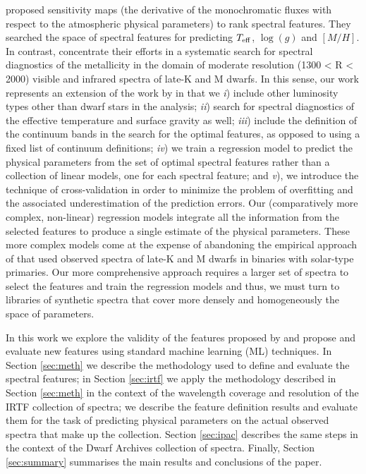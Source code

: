 \cite{cesetti} proposed sensitivity maps (the derivative of the
monochromatic fluxes with respect to the atmospheric physical
parameters) to rank spectral features. They searched the space of
spectral features for predicting $T_{\rm eff}$, $\log(g)$ and
$[M/H]$. In contrast, \cite{2013AJ....145...52M} concentrate their
efforts in a systematic search for spectral diagnostics of the
metallicity in the domain of moderate resolution (1300 < R < 2000)
visible and infrared spectra of late-K and M dwarfs. In this
sense, our work represents an extension of the work
by \cite{2013AJ....145...52M} in that we {\it i}) include other
luminosity types other than dwarf stars in the analysis; {\it ii})
search for spectral diagnostics of the effective temperature and
surface gravity as well; {\it iii}) include the definition of the
continuum bands in the search for the optimal features, as opposed to
using a fixed list of continuum definitions; {\it iv}) we train a
regression model to predict the physical parameters from the set of
optimal spectral features rather than a collection of linear models,
one for each spectral feature; and {\it v}), we introduce the
technique of cross-validation in order to minimize the problem of
overfitting \citep[see e.g.][]{gelman2013bayesian} and the associated
underestimation of the prediction errors. Our (comparatively more
complex, non-linear) regression models integrate all the information
from the selected features to produce a single estimate of the
physical parameters. These more complex models come at the expense of
abandoning the empirical approach of \cite{2013AJ....145...52M} that
used observed spectra of late-K and M dwarfs in binaries with
solar-type primaries. Our more comprehensive approach requires a
larger set of spectra to select the features and train the regression
models and thus, we must turn to libraries of synthetic spectra that
cover more densely and homogeneously the space of parameters.

In this work we explore the validity of the features proposed
by \cite{cesetti} and propose and evaluate new features using standard
machine learning (ML) techniques. In Section \ref{sec:meth} we
describe the methodology used to define and evaluate the spectral
features; in Section \ref{sec:irtf} we apply the methodology described
in Section \ref{sec:meth} in the context of the wavelength coverage
and resolution of the IRTF collection of spectra; we describe the
feature definition results and evaluate them for the task of
predicting physical parameters on the actual observed spectra that
make up the collection. Section \ref{sec:ipac} describes the same
steps in the context of the Dwarf Archives collection of
spectra. Finally, Section \ref{sec:summary} summarises the main
results and conclusions of the paper.
